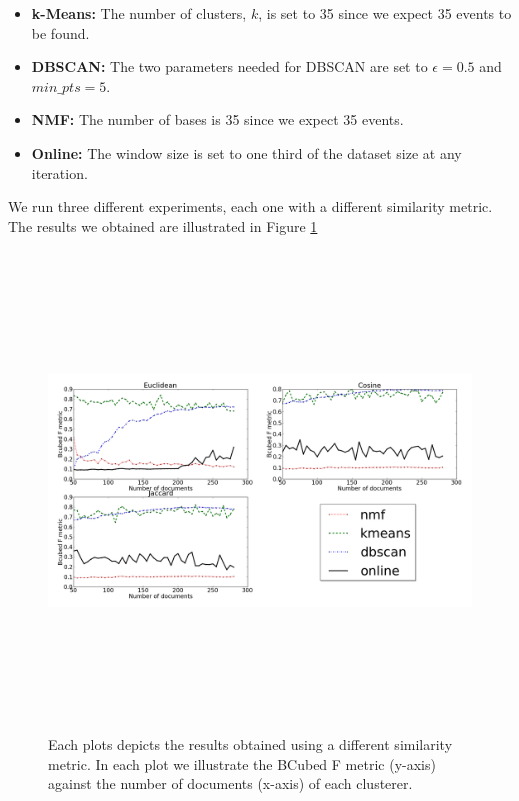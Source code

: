 \begin{itemize}
  \item \textbf{k-Means:} The number of clusters, $k$, is set to 35 since we expect 35 events to be found. 
  \item \textbf{DBSCAN:} The two parameters needed for DBSCAN are set to $\epsilon=0.5$ and $min\_pts=5$. 
  \item \textbf{NMF:} The number of bases is 35 since we expect 35 events.
  \item \textbf{Online:} The window size is set to one third of the dataset size at any iteration. 
\end{itemize}\vspace{15pt}
We run three different experiments, each one with a different similarity metric. The results we obtained are illustrated in Figure \ref{DifferentSizeResults}

\begin{figure}[htbp]
  \begin{center}
    \includegraphics[height=5in, width=6in]{number_of_documents}
    \caption{Each plots depicts the results obtained using a different similarity metric. In each plot we illustrate the BCubed F metric (y-axis) against the number of documents (x-axis) of each clusterer.}
    \label{DifferentSizeResults}
  \end{center}
\end{figure}

